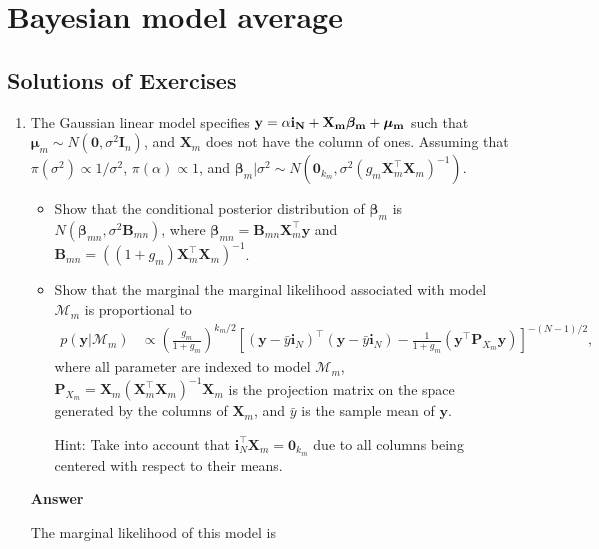 \chapter{Bayesian model average}\label{chap10}

\section*{Solutions of Exercises}\label{sec101}
\begin{enumerate}[leftmargin=*]

	\item The Gaussian linear model specifies $\bf{y}=\alpha\bm{i}_N+\bm{X}_m\bm{\beta}_m+\bm{\mu}_m$ such that $\bm{\mu}_m\sim{N}(\bm{0},\sigma^2\bm{I}_n)$, and $\bm{X}_m$ does not have the column of ones. Assuming that $\pi(\sigma^2)\propto 1/{\sigma^2}$, $\pi(\alpha)\propto 1$, and $\bm{\beta}_m|\sigma^2 \sim {N}(\bm{0}_{k_m}, \sigma^2 (g_m\bm{X}_m^{\top}\bm{X}_m)^{-1})$.
\begin{itemize}
	\item Show that the conditional posterior distribution of $\bm{\beta}_m$ is $N(\bm{\beta}_{mn},\sigma^2\bm{B}_{mn})$, where $\bm{\beta}_{mn}=\bm{B}_{mn}\bm{X}_m^{\top}\bm{y}$ and $\bm{B}_{mn}=((1+g_m)\bm{X}_m^{\top}\bm{X}_m)^{-1}$.
	\item Show that the marginal the marginal likelihood associated with model $\mathcal{M}_m$ is proportional to
	\begin{align*}
		p(\bm{y}|\mathcal{M}_m)&\propto \left(\frac{g_m}{1+g_m}\right)^{k_m/2} \left[(\bm{y}-\bar{y}\bm{i}_N)^{\top}(\bm{y}-\bar{y}\bm{i}_N)-\frac{1}{1+g_m}(\bm{y}^{\top}\bm{P}_{X_m}\bm{y})\right]^{-(N-1)/2},
	\end{align*}
	where all parameter are indexed to model $\mathcal{M}_m$, $\bm{P}_{X_m}=\bm{X}_m(\bm{X}_m^{\top}\bm{X}_m)^{-1}\bm{X}_m$ is the projection matrix on the space generated by the columns of $\bm{X}_m$, and $\bar{y}$ is the sample mean of $\bm{y}$.
	
	Hint: Take into account that $\bm{i}_N^{\top}\bm{X}_m=\bm{0}_{k_m}$ due to all columns being centered with respect to their means.
\end{itemize}
\textbf{Answer}

The marginal likelihood of this model is


\end{enumerate}
